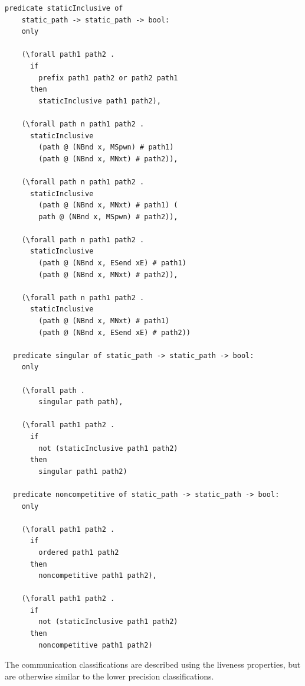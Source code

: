 \documentclass[10pt]{article}
\begin{document}
\begin{lstlisting}[language=logic, mathescape]
  predicate staticInclusive of
    static_path -> static_path -> bool:
    only

    (\forall path1 path2 .
      if
        prefix path1 path2 or path2 path1
      then
        staticInclusive path1 path2),

    (\forall path n path1 path2 .
      staticInclusive
        (path @ (NBnd x, MSpwn) # path1)
        (path @ (NBnd x, MNxt) # path2)),

    (\forall path n path1 path2 .
      staticInclusive
        (path @ (NBnd x, MNxt) # path1) (
        path @ (NBnd x, MSpwn) # path2)),

    (\forall path n path1 path2 .
      staticInclusive
        (path @ (NBnd x, ESend xE) # path1)
        (path @ (NBnd x, MNxt) # path2)),

    (\forall path n path1 path2 .
      staticInclusive
        (path @ (NBnd x, MNxt) # path1)
        (path @ (NBnd x, ESend xE) # path2))

  predicate singular of static_path -> static_path -> bool:
    only 

    (\forall path .
        singular path path),

    (\forall path1 path2 .
      if
        not (staticInclusive path1 path2)
      then
        singular path1 path2)

  predicate noncompetitive of static_path -> static_path -> bool:
    only

    (\forall path1 path2 . 
      if
        ordered path1 path2
      then
        noncompetitive path1 path2),

    (\forall path1 path2 .
      if
        not (staticInclusive path1 path2)
      then
        noncompetitive path1 path2)
  \end{lstlisting}

The communication classifications are described using the liveness properties, but
are otherwise similar to the lower precision classifications.
\end{document}
